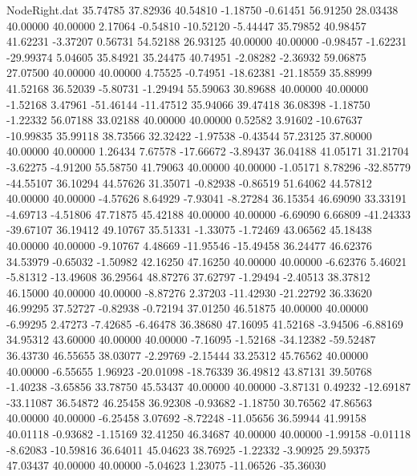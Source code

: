 \begin{filecontents}{NodeRight.dat}
  35.74785   37.82936   40.54810    -1.18750   -0.61451   56.91250   28.03438   40.00000   40.00000    2.17064   -0.54810  -10.52120   -5.44447
  35.79852   40.98457   41.62231    -3.37207    0.56731   54.52188   26.93125   40.00000   40.00000   -0.98457   -1.62231  -29.99374    5.04605
  35.84921   35.24475   40.74951    -2.08282   -2.36932   59.06875   27.07500   40.00000   40.00000    4.75525   -0.74951  -18.62381  -21.18559
  35.88999   41.52168   36.52039    -5.80731   -1.29494   55.59063   30.89688   40.00000   40.00000   -1.52168    3.47961  -51.46144  -11.47512
  35.94066   39.47418   36.08398    -1.18750   -1.22332   56.07188   33.02188   40.00000   40.00000    0.52582    3.91602  -10.67637  -10.99835
  35.99118   38.73566   32.32422    -1.97538   -0.43544   57.23125   37.80000   40.00000   40.00000    1.26434    7.67578  -17.66672   -3.89437
  36.04188   41.05171   31.21704    -3.62275   -4.91200   55.58750   41.79063   40.00000   40.00000   -1.05171    8.78296  -32.85779  -44.55107
  36.10294   44.57626   31.35071    -0.82938   -0.86519   51.64062   44.57812   40.00000   40.00000   -4.57626    8.64929   -7.93041   -8.27284
  36.15354   46.69090   33.33191    -4.69713   -4.51806   47.71875   45.42188   40.00000   40.00000   -6.69090    6.66809  -41.24333  -39.67107
  36.19412   49.10767   35.51331    -1.33075   -1.72469   43.06562   45.18438   40.00000   40.00000   -9.10767    4.48669  -11.95546  -15.49458
  36.24477   46.62376   34.53979    -0.65032   -1.50982   42.16250   47.16250   40.00000   40.00000   -6.62376    5.46021   -5.81312  -13.49608
  36.29564   48.87276   37.62797    -1.29494   -2.40513   38.37812   46.15000   40.00000   40.00000   -8.87276    2.37203  -11.42930  -21.22792
  36.33620   46.99295   37.52727    -0.82938   -0.72194   37.01250   46.51875   40.00000   40.00000   -6.99295    2.47273   -7.42685   -6.46478
  36.38680   47.16095   41.52168    -3.94506   -6.88169   34.95312   43.60000   40.00000   40.00000   -7.16095   -1.52168  -34.12382  -59.52487
  36.43730   46.55655   38.03077    -2.29769   -2.15444   33.25312   45.76562   40.00000   40.00000   -6.55655    1.96923  -20.01098  -18.76339
  36.49812   43.87131   39.50768    -1.40238   -3.65856   33.78750   45.53437   40.00000   40.00000   -3.87131    0.49232  -12.69187  -33.11087
  36.54872   46.25458   36.92308    -0.93682   -1.18750   30.76562   47.86563   40.00000   40.00000   -6.25458    3.07692   -8.72248  -11.05656
  36.59944   41.99158   40.01118    -0.93682   -1.15169   32.41250   46.34687   40.00000   40.00000   -1.99158   -0.01118   -8.62083  -10.59816
  36.64011   45.04623   38.76925    -1.22332   -3.90925   29.59375   47.03437   40.00000   40.00000   -5.04623    1.23075  -11.06526  -35.36030

\end{filecontents}
